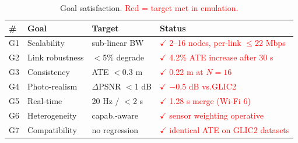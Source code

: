 \begin{table}[t]
  \centering
  \caption{Goal satisfaction. \textcolor{red}{Red = target met in emulation.}}
  \label{tab:goals}
  \footnotesize
  \setlength{\tabcolsep}{3pt}
  \begin{tabular}{@{}p{0.4cm}p{1.8cm}p{1.1cm}p{4.0cm}@{}}
    \toprule
    \# & Goal & Target & Status \\
    \midrule
    G1 & Scalability     & sub-linear BW    & \textcolor{red}{$\checkmark$ 2--16 nodes, per-link $\le$22 Mbps} \\
    G2 & Link robustness & $<$5\% degrade    & \textcolor{red}{$\checkmark$ 4.2\% ATE increase after 30 s} \\
    G3 & Consistency     & ATE $<$0.3 m     & \textcolor{red}{$\checkmark$ 0.22 m at $N=16$} \\
    G4 & Photo-realism   & $\Delta$PSNR $<$1 dB & \textcolor{red}{$\checkmark$ $-$0.5 dB vs.\@ GLIC2} \\
    G5 & Real-time       & 20 Hz / $<$2 s   & \textcolor{red}{$\checkmark$ 1.28 s merge (Wi-Fi 6)} \\
    G6 & Heterogeneity   & capab.\@-aware  & \textcolor{red}{$\checkmark$ sensor weighting operative} \\
    G7 & Compatibility   & no regression    & \textcolor{red}{$\checkmark$ identical ATE on GLIC2 datasets} \\
    \bottomrule
  \end{tabular}
\end{table}
